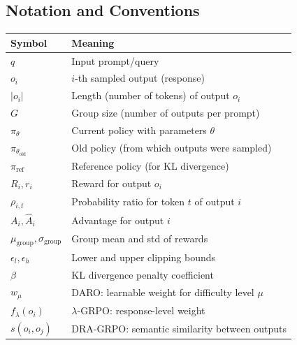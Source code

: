 \documentclass[11pt,a4paper]{article}
\begin{document}
\subsection*{Notation and Conventions}

\begin{center}
\begin{tabular}{@{}ll@{}}
\toprule
\textbf{Symbol} & \textbf{Meaning} \\
\midrule
$q$ & Input prompt/query \\
$o_i$ & $i$-th sampled output (response) \\
$|o_i|$ & Length (number of tokens) of output $o_i$ \\
$G$ & Group size (number of outputs per prompt) \\
$\pi_\theta$ & Current policy with parameters $\theta$ \\
$\pi_{\theta_{\text{old}}}$ & Old policy (from which outputs were sampled) \\
$\pi_{\text{ref}}$ & Reference policy (for KL divergence) \\
$R_i, r_i$ & Reward for output $o_i$ \\
$\rho_{i,t}$ & Probability ratio for token $t$ of output $i$ \\
$A_i, \hat{A}_i$ & Advantage for output $i$ \\
$\mu_{\text{group}}, \sigma_{\text{group}}$ & Group mean and std of rewards \\
$\epsilon_l, \epsilon_h$ & Lower and upper clipping bounds \\
$\beta$ & KL divergence penalty coefficient \\
$w_\mu$ & DARO: learnable weight for difficulty level $\mu$ \\
$f_\lambda(o_i)$ & $\lambda$-GRPO: response-level weight \\
$s(o_i, o_j)$ & DRA-GRPO: semantic similarity between outputs \\
\bottomrule
\end{tabular}
\end{center}

\tableofcontents
\newpage

\end{document}
